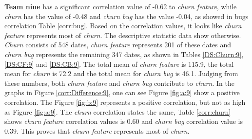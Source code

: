 \documentclass[UKenglish]{ifimaster}  %
\begin{document}
\textbf{Team nine} has a significant correlation value of -0.62 to \textit{churn feature}, while \textit{churn} has the value of -0.48 and \textit{churn bug} has the value -0.04, as showed in bugs correlation Table \ref{corr:bug}. Based on the correlation values, it looks like \textit{churn feature} represents most of \textit{churn}. The descriptive statistic data show otherwise. \textit{Churn} consists of 548 dates, \textit{churn feature} represents 201 of these dates and \textit{churn bug} represents the remaining 347 dates, as shown in Tables \ref{DS:Churn:9}, \ref{DS:CF:9} and \ref{DS:CB:9}.  The total mean of \textit{churn feature} is 115.9, the total mean for \textit{churn} is 72.2 and the total mean for \textit{churn bug} is 46.1. Judging from these numbers, both \textit{churn feature} and \textit{churn bug} contribute to \textit{churn}. In the graphs in Figure \ref{corr:Difference:9}, one can see Figure \ref{fig:a:9} show a positive correlation. The Figure \ref{fig:b:9} represents a positive correlation, but not as high as Figure \ref{fig:a:9}. The \textit{churn} correlation states the same,  Table \ref{corr:churn} shows \textit{churn feature} correlation values is 0.60 and \textit{churn bug} correlation value is 0.39. This proves that \textit{churn feature} represents most of \textit{churn}.
\end{document}
